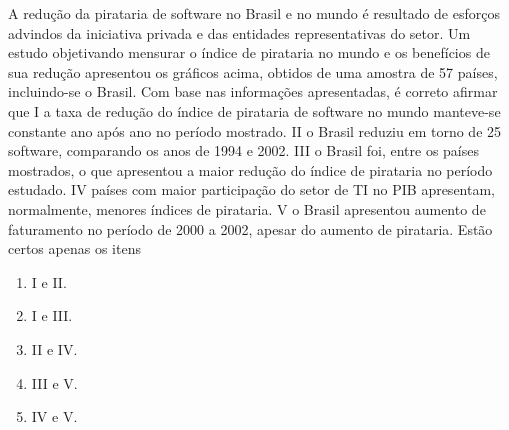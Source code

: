 \documentclass{exam}
\begin{document}
\begin{questions}
A redução da pirataria de software no Brasil e no mundo
é resultado de esforços advindos da iniciativa privada e das
entidades representativas do setor. Um estudo objetivando
mensurar o índice de pirataria no mundo e os benefícios de sua
redução apresentou os gráficos acima, obtidos de uma amostra
de 57 países, incluindo-se o Brasil.
Com base nas informações apresentadas, é correto afirmar que
I a taxa de redução do índice de pirataria de software no mundo
manteve-se constante ano após ano no período mostrado.
II o Brasil reduziu em torno de 25%
software, comparando os anos de 1994 e 2002.
III o Brasil foi, entre os países mostrados, o que apresentou a maior
redução do índice de pirataria no período estudado.
IV países com maior participação do setor de TI no PIB apresentam,
normalmente, menores índices de pirataria.
V o Brasil apresentou aumento de faturamento no período de 2000
a 2002, apesar do aumento de pirataria.
Estão certos apenas os itens
	\begin{enumerate}[label=\alph*)]
		\item  I e II. 
		\item  I e III. 
		\item  II e IV.
		\item  III e V.
		\item  IV e V.
	\end{enumerate}


\end{questions}
\end{document}

